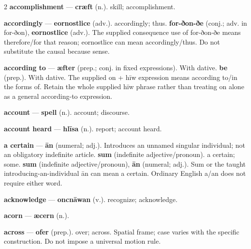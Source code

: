 \begin{multicols}{2}
\textbf{accomplishment} — \textbf{cræft} (n.). skill; accomplishment.\par
\textbf{accordingly} — \textbf{eornostlice} (adv.). accordingly; thus. \textbf{for-ðon-ðe} (conj.; adv. in for-ðon), \textbf{eornostlice} (adv.). The supplied consequence use of for-ðon-ðe means therefore/for that reason; eornostlice can mean accordingly/thus. Do not substitute the causal because sense.\par
\textbf{according to} — \textbf{æfter} (prep.; conj. in fixed expressions). With dative. \textbf{be} (prep.). With dative. The supplied on + hīw expression means according to/in the forms of. Retain the whole supplied hīw phrase rather than treating on alone as a general according-to expression.\par
\textbf{account} — \textbf{spell} (n.). account; discourse.\par
\textbf{account heard} — \textbf{hlīsa} (n.). report; account heard.\par
\textbf{a certain} — \textbf{ān} (numeral; adj.). Introduces an unnamed singular individual; not an obligatory indefinite article. \textbf{sum} (indefinite adjective/pronoun). a certain; some. \textbf{sum} (indefinite adjective/pronoun), \textbf{ān} (numeral; adj.). Sum or the taught introducing-an-individual ān can mean a certain. Ordinary English a/an does not require either word.\par
\textbf{acknowledge} — \textbf{oncnāwan} (v.). recognize; acknowledge.\par
\textbf{acorn} — \textbf{æcern} (n.).\par
\textbf{across} — \textbf{ofer} (prep.). over; across. Spatial frame; case varies with the specific construction. Do not impose a universal motion rule.\par

\end{multicols}
